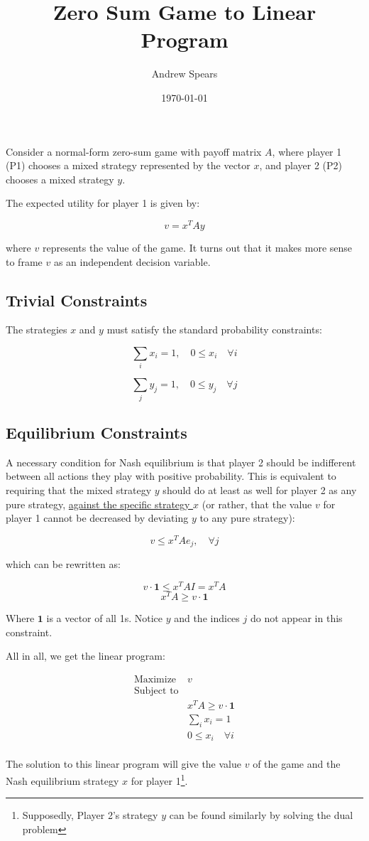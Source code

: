 \documentclass[a4paper,12pt]{article}
\title{Zero Sum Game to Linear Program}
\author{Andrew Spears}
\date{\today}
\begin{document}
\maketitle

Consider a normal-form zero-sum game with payoff matrix \( A \), where player 1 (P1) chooses a mixed strategy represented by the vector \( x \), and player 2 (P2) chooses a mixed strategy \( y \).

The expected utility for player 1 is given by:

\[
v = x^T A y
\]

where \( v \) represents the value of the game. It turns out that it makes more sense to frame $v$ as an independent decision variable.

\subsection*{Trivial Constraints}

The strategies \( x \) and \( y \) must satisfy the standard probability constraints:

\[
\sum_i x_i = 1, \quad 0 \leq x_i \quad \forall i
\]

\[
\sum_j y_j = 1, \quad 0 \leq y_j \quad \forall j
\]



\subsection*{Equilibrium Constraints}

A necessary condition for Nash equilibrium is that player 2 should be indifferent between all actions they play with positive probability. This is equivalent to requiring that the mixed strategy \( y \) should do at least as well for player 2 as any pure strategy, \underline{against the specific strategy \( x \)} (or rather, that the value $v$ for player 1 cannot be decreased by deviating $y$ to any pure strategy):

\[
v \leq x^T A e_j, \quad \forall j
\]

which can be rewritten as:

\[
v \cdot \mathbf{1} \leq x^T A I = x^T A
\]
\[ x^T A \geq v \cdot \mathbf{1} \]

Where $\mathbf{1}$ is a vector of all 1s.
Notice $y$ and the indices $j$ do not appear in this constraint.

All in all, we get the linear program:

\begin{equation}
\boxed{
\begin{array}{rl}
    \text{Maximize } & v \\
    \text{Subject to} & \\
    & x^T A \geq v \cdot \mathbf{1} \\
    & \sum_i x_i = 1 \\
    & 0 \leq x_i \quad \forall i \\
\end{array}
}
\end{equation}

The solution to this linear program will give the value \( v \) of the game and the Nash equilibrium strategy \( x \) for player 1\footnote{Supposedly, Player 2's strategy \( y \) can be found similarly by solving the dual problem}. 
\end{document}

